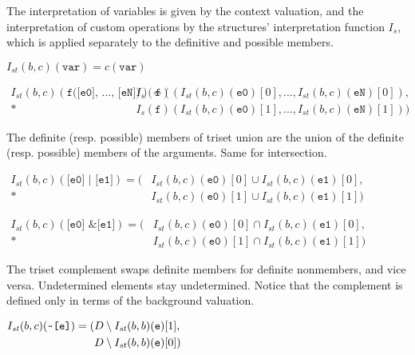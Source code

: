 \documentclass[oneside,12pt]{book}
\theoremstyle{definition}
\theoremstyle{remark}
\newcommand{\tde}{\raisebox{0.5ex}{\texttildelow}}
\newcommand\var[1]{\mathop{\mathit{#1}}\nolimits}
\newcommand{\st}{\var{st}}
\begin{document}
The interpretation of variables is given by the context valuation,
and the interpretation of custom operations by the structures' interpretation
function $I_s$, which is applied separately to the definitive and possible members.

\begin{defBox}
  $I_{\st}(b,c)(\texttt{var}) = c(\texttt{var})$
  
  \medskip \noindent $\begin{aligned}
    I_{\st}(b,c)(\texttt{f([e0], ..., [eN])}) =
      (&I_s(\texttt{f})
        (I_{\st}(b,c)(\texttt{e0})[0], ..., I_{\st}(b,c)(\texttt{eN})[0]), \\*
      &I_s(\texttt{f})
        (I_{\st}(b,c)(\texttt{e0})[1], ..., I_{\st}(b,c)(\texttt{eN})[1]))
    \end{aligned}$
\end{defBox}

The definite (resp. possible) members of triset union are the union
of the definite (resp. possible) members of the arguments. Same for intersection.

\begin{defBox}
  $\begin{aligned}
    I_{\st}(b,c)(\texttt{[e0] | [e1]}) =
    (&I_{\st}(b,c)(\texttt{e0})[0] \cup I_{\st}(b,c)(\texttt{e1})[0], \\*
    &I_{\st}(b,c)(\texttt{e0})[1] \cup I_{\st}(b,c)(\texttt{e1})[1])
    \end{aligned}$
  
  \bigskip \noindent $\begin{aligned}
    I_{\st}(b,c)(\texttt{[e0] \& [e1]}) =
    (&I_{\st}(b,c)(\texttt{e0})[0] \cap I_{\st}(b,c)(\texttt{e1})[0], \\*
    &I_{\st}(b,c)(\texttt{e0})[1] \cap I_{\st}(b,c)(\texttt{e1})[1])
    \end{aligned}$
\end{defBox}

The triset complement swaps definite members for definite nonmembers,
and vice versa. Undetermined elements stay undetermined. Notice that
the complement is defined only in terms of the background valuation.

\begin{defBox}
  $\begin{aligned}
    I_{\st}(b,c)(\texttt{\tde [e]}) =
    (&D \setminus I_{\st}(b,b)(\texttt{e})[1], \\*
    &D \setminus I_{\st}(b,b)(\texttt{e})[0])
    \end{aligned}$
\end{defBox}
\end{document}
